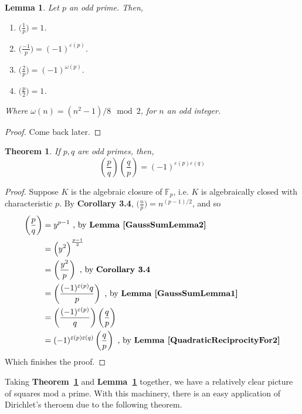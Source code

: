 \documentclass[12pt]{article}
\newcommand{\lref}[1]{\textbf{Lemma~\ref{#1}}}
\newcommand{\tref}[1]{\textbf{Theorem~\ref{#1}}}
\newtheorem{thm}{Theorem}
\newtheorem{lemma}{Lemma}
\numberwithin{equation}{section}
\numberwithin{thm}{section}
\numberwithin{lemma}{section}
\numberwithin{cor}{section}
\begin{document}
\begin{lemma}\label{QuadraticReciprocityFor2}
  Let $p$ an odd prime. Then, \begin{enumerate}
    \item $\big( \frac{1}{p} \big) = 1$.
    \item $\big( \frac{-1}{p} \big) = (-1)^{\varepsilon(p)}$.
    \item $\big( \frac{2}{p} \big) = (-1)^{\omega(p)}$.
    \item $\big( \frac{p}{2} \big) = 1$.
  \end{enumerate} Where $\omega(n) = (n^2 - 1)/8 \mod 2$, for $n$ an odd integer.
\end{lemma}
\begin{proof}
  Come back later.
\end{proof}

\begin{thm}\label{QuadraticReciprocity}
  If $p, q$ are odd primes, then, \begin{equation*}
    \left( \frac{p}{q} \right) \left( \frac{q}{p} \right) = (-1)^{\varepsilon(p) \varepsilon(q)}
  \end{equation*}
\end{thm}
\begin{proof}
  Suppose $K$ is the algebraic closure of $\mathbb{F}_p$, i.e. $K$ is algebraically closed with characteristic $p$. By \textbf{Corollary 3.4}, $\big( \frac{n}{p} \big) = n^{(p-1)/2}$, and so \begin{align*}
    \left( \frac{p}{q} \right) &= y^{p-1} \text{ , by \lref{GaussSumLemma2}} \\
    &= \Big(y^2 \Big)^{\frac{p-1}{2}} \\
    &= \left( \frac{y^2}{p} \right) \text{ , by } \textbf{Corollary 3.4} \\
    &= \left( \frac{(-1)^{\varepsilon(p)}q}{p} \right) \text{ , by \lref{GaussSumLemma1}} \\
    &= \left( \frac{(-1)^{\varepsilon(p)}}{q} \right) \left( \frac{q}{p} \right) \\
    &= (-1)^{\varepsilon(p)\varepsilon(q)} \left( \frac{q}{p} \right) \text{ , by \lref{QuadraticReciprocityFor2}}
  \end{align*} Which finishes the proof.
\end{proof}

Taking \tref{QuadraticReciprocity} and \lref{QuadraticReciprocityFor2} together, we have a relatively clear picture of squares mod a prime. With this machinery, there is an easy application of Dirichlet's theroem due to the following theorem.
\end{document}
